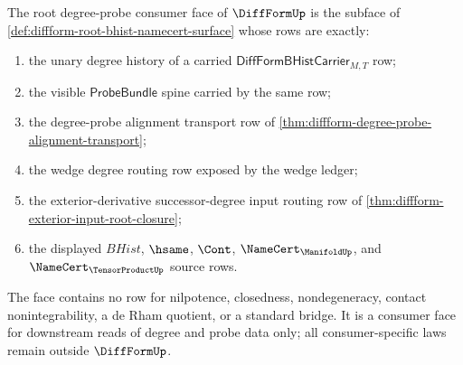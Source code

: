 \begin{definition}
\label{def:diffform-root-degree-probe-consumer-face}
The root degree-probe consumer face of $\DiffFormUp$ is the subface of
\autoref{def:diffform-root-bhist-namecert-surface} whose rows are exactly:
\begin{enumerate}
  \item the unary degree history of a carried
  $\mathsf{DiffFormBHistCarrier}_{M,T}$ row;
  \item the visible $\mathsf{ProbeBundle}$ spine carried by the same row;
  \item the degree-probe alignment transport row of
  \autoref{thm:diffform-degree-probe-alignment-transport};
  \item the wedge degree routing row exposed by the wedge ledger;
  \item the exterior-derivative successor-degree input routing row of
  \autoref{thm:diffform-exterior-input-root-closure};
  \item the displayed $BHist$, $\hsame$, $\Cont$,
  $\NameCert_{\ManifoldUp}$, and $\NameCert_{\TensorProductUp}$ source rows.
\end{enumerate}
The face contains no row for nilpotence, closedness, nondegeneracy, contact
nonintegrability, a de Rham quotient, or a standard bridge. It is a consumer
face for downstream reads of degree and probe data only; all consumer-specific
laws remain outside $\DiffFormUp$.
\end{definition}

